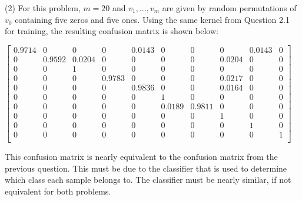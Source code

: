 (2) For this problem, $m = 20$ and $v_{1},...,v_{m}$ are given by random permutations of $v_{0}$ containing five zeros and five ones. Using the same kernel from Question 2.1 for training, the resulting confusion matrix is shown below:
\begin{center}
    $\begin{bmatrix}
        0.9714 & 0 & 0 & 0 & 0.0143 & 0 & 0 & 0 & 0.0143 & 0 \\
        0 & 0.9592 & 0.0204 & 0 & 0 & 0 & 0 & 0.0204 & 0 & 0 \\
        0 & 0 & 1 & 0 & 0 & 0 & 0 & 0 & 0 & 0 \\
        0 & 0 & 0 & 0.9783 & 0 & 0 & 0 & 0.0217 & 0 & 0 \\
        0 & 0 & 0 & 0 & 0.9836 & 0 & 0 & 0.0164 & 0 & 0 \\
        0 & 0 & 0 & 0 & 0 & 1 & 0 & 0 & 0 & 0 \\
        0 & 0 & 0 & 0 & 0 & 0.0189 & 0.9811 & 0 & 0 & 0 \\
        0 & 0 & 0 & 0 & 0 & 0 & 0 & 1 & 0 & 0 \\
        0 & 0 & 0 & 0 & 0 & 0 & 0 & 0 & 1 & 0 \\
        0 & 0 & 0 & 0 & 0 & 0 & 0 & 0 & 0 & 1 \\
    \end{bmatrix}$
\end{center}
This confusion matrix is nearly equivalent to the confusion matrix from the previous question. This must be due to the classifier that is used to determine which class each sample belongs to. The classifier must be nearly similar, if not equivalent for both problems.

